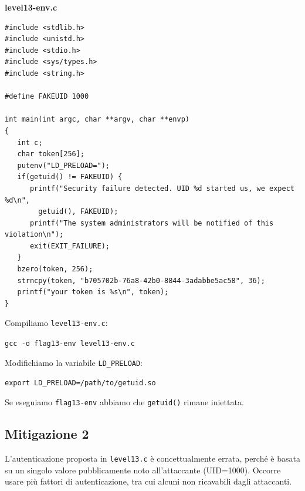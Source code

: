 \begin{mdframed}[backgroundcolor=white!20,shadow=false]
\textbf{level13-env.c}
\begin{verbatim}
#include <stdlib.h>
#include <unistd.h>
#include <stdio.h>
#include <sys/types.h>
#include <string.h>

#define FAKEUID 1000

int main(int argc, char **argv, char **envp)
{
   int c;
   char token[256];
   putenv("LD_PRELOAD=");
   if(getuid() != FAKEUID) {
      printf("Security failure detected. UID %d started us, we expect %d\n", 
        getuid(), FAKEUID);
      printf("The system administrators will be notified of this violation\n");
      exit(EXIT_FAILURE);
   }
   bzero(token, 256);
   strncpy(token, "b705702b-76a8-42b0-8844-3adabbe5ac58", 36);
   printf("your token is %s\n", token);
}
\end{verbatim}
\end{mdframed}
Compiliamo \texttt{level13-env.c}:
\begin{center}
    \texttt{gcc -o flag13-env level13-env.c}
\end{center}
Modifichiamo la variabile \texttt{LD\_PRELOAD}:
\begin{center}
    \texttt{export LD\_PRELOAD=/path/to/getuid.so}
\end{center}
Se eseguiamo \texttt{flag13-env} abbiamo che \texttt{getuid()} rimane iniettata.

\subsection{Mitigazione 2}
L'autenticazione proposta in \texttt{level13.c} è concettualmente errata, perché è basata su un singolo valore pubblicamente noto all'attaccante (UID=1000). Occorre usare più fattori di autenticazione, tra cui alcuni non ricavabili dagli attaccanti.


\let\cleardoublepage\clearpage